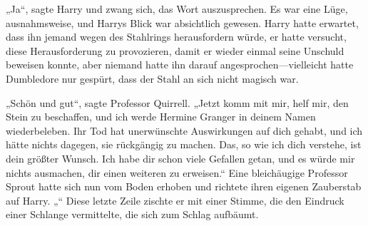„Ja“, sagte Harry und zwang sich, das Wort auszusprechen.
Es war eine Lüge, ausnahmsweise, und Harrys Blick war absichtlich gewesen. Harry hatte erwartet, dass ihn jemand wegen des Stahlrings herausfordern würde, er hatte versucht, diese Herausforderung zu provozieren, damit er wieder einmal seine Unschuld beweisen konnte, aber niemand hatte ihn darauf angesprochen—vielleicht hatte Dumbledore nur gespürt, dass der Stahl an sich nicht magisch war.

„Schön und gut“, sagte Professor Quirrell. „Jetzt komm mit mir, helf mir, den Stein zu beschaffen, und ich werde Hermine Granger in deinem Namen wiederbeleben. Ihr Tod hat unerwünschte Auswirkungen auf dich gehabt, und ich hätte nichts dagegen, sie rückgängig zu machen. Das, so wie ich dich verstehe, ist dein größter Wunsch. Ich habe dir schon viele Gefallen getan, und es würde mir nichts ausmachen, dir einen weiteren zu erweisen.“
Eine bleichäugige Professor Sprout hatte sich nun vom Boden erhoben und richtete ihren eigenen Zauberstab auf Harry.
„“
Diese letzte Zeile zischte er mit einer Stimme, die den Eindruck einer Schlange vermittelte, die sich zum Schlag aufbäumt.

